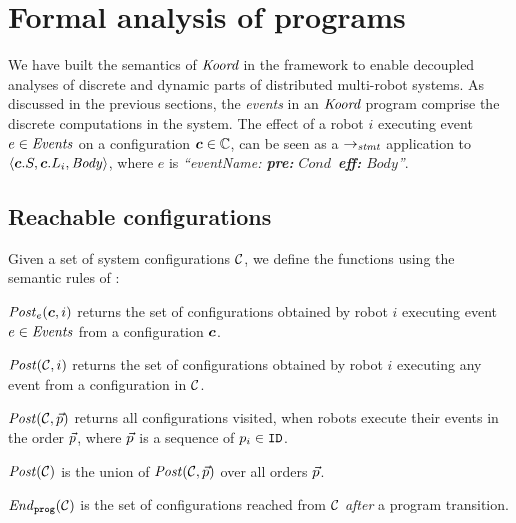
\section{Formal analysis of \lgname programs}
\label{sec:verification}

\newcommand{\Ev}{\ensuremath{e}\xspace}
\newcommand{\EvCond}{\ensuremath{\mathit{Cond}}\xspace}
\newcommand{\EvBody}{\ensuremath{\mathit{Body}}\xspace}


We have built the semantics of $\emph{Koord}$ in the \K framework to enable decoupled analyses of discrete and dynamic parts of distributed multi-robot systems.
As discussed in the previous sections, the \emph{events} in an $\emph{Koord}$ program comprise the discrete computations in the system.
The effect of a robot $i$ executing event $\Ev \in \Event$ on a configuration $\mathit{\boldsymbol{c}} \in \mathbb{C}$,
can be seen as a $\rightarrow_\mathit{stmt}$ application to  $\left\langle \gconfig.S, \gconfig.\lconfig{i}, \EvBody \right\rangle $,
where $\Ev$ is \emph{``eventName: {\normalfont\bf pre:} \EvCond\ {\normalfont\bf eff:} \EvBody''}.


\subsection{Reachable configurations}

Given a set of system configurations $\mathcal{C}$, we define the functions using the semantic rules of :
\begin{inparaenum}[(i)]
    \item $\Post_\Ev(\gconfig,i)$ returns the set of configurations obtained by robot $i$ executing event $\Ev \in \Event$ from a configuration $\mathit{\boldsymbol{c}}$.
    \item $\mathit{Post}(\mathcal{C},i)$ returns the set of configurations obtained by robot $i$ executing any event from a configuration in $\mathcal{C}$.
    \item $\mathit{Post}(\mathcal{C},\vec{p})$ returns all configurations visited, when robots execute their events in the order $\vec{p}$,
          where $\vec{p}$ is a sequence of $p_i \in \texttt{ID}$.
    \item $\mathit{Post}(\mathcal{C})$ is the union of $\mathit{Post}(\mathcal{C},\vec{p})$ over all orders $\vec{p}$.
    \item $\mathit{End}_{\mathtt{prog}}(\mathcal{C})$ is the set of configurations reached from $\mathcal{C}$ \emph{after} a program transition.
\end{inparaenum}

